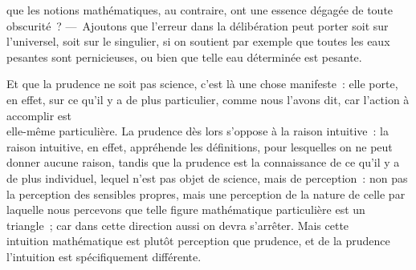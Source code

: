 \documentclass[french,twoside]{book} %
\begin{document}
que les notions mathématiques, au contraire, ont une essence dégagée de toute obscurité ? — Ajoutons que l’erreur dans la délibération peut porter soit sur l’universel, soit sur le singulier, si on soutient par exemple que toutes les eaux pesantes sont pernicieuses, ou bien que telle eau déterminée est pesante.\par
Et que la prudence ne soit pas science, c’est là une chose manifeste : elle porte, en effet, sur ce qu’il y a de plus particulier, comme nous l’avons dit, car l’action à accomplir est \\
elle-même particulière. La prudence dès lors s’oppose à la raison intuitive : la raison intuitive, en effet, appréhende les définitions, pour lesquelles on ne peut donner aucune raison, tandis que la prudence est la connaissance de ce qu’il y a de plus individuel, lequel n’est pas objet de science, mais de perception : non pas la perception des sensibles propres, mais une perception de la nature de celle par laquelle nous percevons que telle figure mathématique particulière est un triangle ; car dans cette direction aussi on devra s’arrêter. Mais cette \\
intuition mathématique est plutôt perception que prudence, et de la prudence l’intuition est spécifiquement différente.
\end{document}
